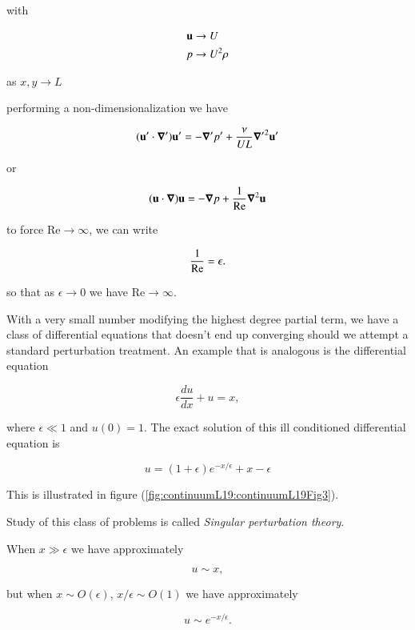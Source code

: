 with 

\begin{align}\label{eqn:continuumL19:570}
\mathbf{u} &\rightarrow U \\
p &\rightarrow U^2 \rho
\end{align}

as $x, y \rightarrow L$

performing a non-dimensionalization we have

\begin{equation}\label{eqn:continuumL19:590}
(\mathbf{u}' \cdot \boldsymbol{\nabla}') \mathbf{u}' = -\boldsymbol{\nabla}' p' + \frac{\nu}{U L} {\boldsymbol{\nabla}'}^2 \mathbf{u}'
\end{equation}

or

\begin{equation}\label{eqn:continuumL19:610}
(\mathbf{u} \cdot \boldsymbol{\nabla}) \mathbf{u} = -\boldsymbol{\nabla} p + \frac{1}{\text{Re}} {\boldsymbol{\nabla}}^2 \mathbf{u}
\end{equation}

to force $\text{Re} \rightarrow \infty$, we can write

\begin{equation}\label{eqn:continuumL19:630}
\frac{1}{\text{Re}} = \epsilon.
\end{equation}

so that as $\epsilon \rightarrow 0$ we have $\text{Re} \rightarrow \infty$.

With a very small number modifying the highest degree partial term, we have a class of differential equations that doesn't end up converging should we attempt a standard perturbation treatment.  An example that is analogous is the differential equation

\begin{equation}\label{eqn:continuumL19:650}
\epsilon \frac{du}{dx} + u = x,
\end{equation}

where $\epsilon \ll 1$ and $u(0) = 1$.  The exact solution of this ill conditioned differential equation is

\begin{equation}\label{eqn:continuumL19:670}
u = (1 + \epsilon) e^{-x/\epsilon} + x - \epsilon
\end{equation}

This is illustrated in figure (\ref{fig:continuumL19:continuumL19Fig3}).


Study of this class of problems is called \textit{Singular perturbation theory}.

When $x \gg \epsilon$ we have approximately

\begin{equation}\label{eqn:continuumL19:690}
u \sim x,
\end{equation}

but when $x \sim O(\epsilon)$, $x/\epsilon \sim O(1)$ we have approximately

\begin{equation}\label{eqn:continuumL19:710}
u \sim e^{-x/\epsilon}.
\end{equation}
